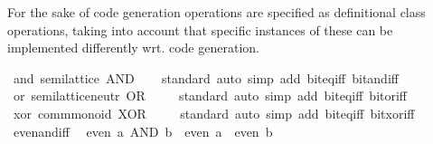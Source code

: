\begin{isabellebody}
\begin{isamarkuptext}
  For the sake of code generation operations 
  are specified as definitional class operations,
  taking into account that specific instances of these can be implemented
  differently wrt. code generation.%
\end{isamarkuptext}\isamarkuptrue%
\isamarkupfalse%
\ {\isachardoublequoteopen}and{\isachardoublequoteclose}{\isacharcolon}{\kern0pt}\ semilattice\ {\isacartoucheopen}{\isacharparenleft}{\kern0pt}AND{\isacharparenright}{\kern0pt}{\isacartoucheclose}\isanewline
%
\isadelimproof
\ \ %
\endisadelimproof
%
\isatagproof
{}\isamarkupfalse%
\ standard\ {\isacharparenleft}{\kern0pt}auto\ simp\ add{\isacharcolon}{\kern0pt}\ bit{\isacharunderscore}{\kern0pt}eq{\isacharunderscore}{\kern0pt}iff\ bit{\isacharunderscore}{\kern0pt}and{\isacharunderscore}{\kern0pt}iff{\isacharparenright}{\kern0pt}%
\endisatagproof
{\isafoldproof}%
%
\isadelimproof
\isanewline
%
\endisadelimproof
\isanewline
{}\isamarkupfalse%
\ or{\isacharcolon}{\kern0pt}\ semilattice{\isacharunderscore}{\kern0pt}neutr\ {\isacartoucheopen}{\isacharparenleft}{\kern0pt}OR{\isacharparenright}{\kern0pt}{\isacartoucheclose}\ {}\isanewline
%
\isadelimproof
\ \ %
\endisadelimproof
%
\isatagproof
{}\isamarkupfalse%
\ standard\ {\isacharparenleft}{\kern0pt}auto\ simp\ add{\isacharcolon}{\kern0pt}\ bit{\isacharunderscore}{\kern0pt}eq{\isacharunderscore}{\kern0pt}iff\ bit{\isacharunderscore}{\kern0pt}or{\isacharunderscore}{\kern0pt}iff{\isacharparenright}{\kern0pt}%
\endisatagproof
{\isafoldproof}%
%
\isadelimproof
\isanewline
%
\endisadelimproof
\isanewline
{}\isamarkupfalse%
\ xor{\isacharcolon}{\kern0pt}\ comm{\isacharunderscore}{\kern0pt}monoid\ {\isacartoucheopen}{\isacharparenleft}{\kern0pt}XOR{\isacharparenright}{\kern0pt}{\isacartoucheclose}\ {}\isanewline
%
\isadelimproof
\ \ %
\endisadelimproof
%
\isatagproof
{}\isamarkupfalse%
\ standard\ {\isacharparenleft}{\kern0pt}auto\ simp\ add{\isacharcolon}{\kern0pt}\ bit{\isacharunderscore}{\kern0pt}eq{\isacharunderscore}{\kern0pt}iff\ bit{\isacharunderscore}{\kern0pt}xor{\isacharunderscore}{\kern0pt}iff{\isacharparenright}{\kern0pt}%
\endisatagproof
{\isafoldproof}%
%
\isadelimproof
\isanewline
%
\endisadelimproof
\isanewline
{}\isamarkupfalse%
\ even{\isacharunderscore}{\kern0pt}and{\isacharunderscore}{\kern0pt}iff{\isacharcolon}{\kern0pt}\isanewline
\ \ {\isacartoucheopen}even\ {\isacharparenleft}{\kern0pt}a\ AND\ b{\isacharparenright}{\kern0pt}\ {\isasymlongleftrightarrow}\ even\ a\ {\isasymor}\ even\ b{\isacartoucheclose}\isanewline

\end{isabellebody}
